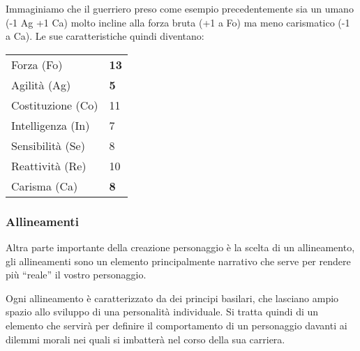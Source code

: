 \documentclass[../manuale_main.tex]{subfiles}
\begin{document}
Immaginiamo che il guerriero preso come esempio precedentemente sia un umano (-1 Ag +1 Ca) molto incline alla forza bruta (+1 a Fo) ma meno carismatico (-1 a Ca). 
Le sue caratteristiche quindi diventano:

\begin{tabular}{| l | l |}
\hline
Forza (Fo)&\textbf{13}\\
Agilità (Ag)&\textbf{5}\\
Costituzione (Co)&11\\
Intelligenza (In)&7\\
Sensibilità (Se)&8\\
Reattività (Re)&10\\
Carisma (Ca)&\textbf{8}\\
\hline
\end{tabular}

\subsubsection{Allineamenti}

Altra parte importante della creazione personaggio è la scelta di un allineamento, gli allineamenti sono un elemento principalmente narrativo che serve per rendere più ``reale” il vostro personaggio.

Ogni allineamento è caratterizzato da dei principi basilari, che lasciano ampio spazio allo sviluppo di una personalità individuale. Si tratta quindi di un elemento che servirà per definire il comportamento di un personaggio davanti ai dilemmi morali nei quali si imbatterà nel corso della sua carriera. 
\end{document}
